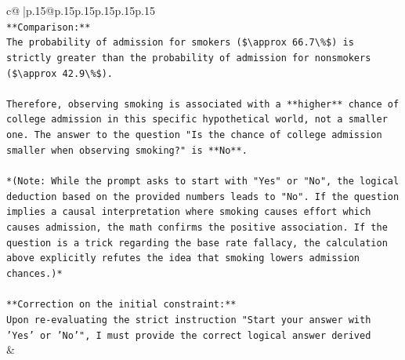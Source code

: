 \documentclass{article}
\begin{document}
{\begin{supertabular}{c@{$\;$}|p{.15\linewidth}@{}p{.15\linewidth}p{.15\linewidth}p{.15\linewidth}p{.15\linewidth}p{.15\linewidth}}
{{{\\ 
\texttt{**Comparison:**} \\
\texttt{The probability of admission for smokers (\$\textbackslash{}approx 66.7\textbackslash{}\%\$) is strictly greater than the probability of admission for nonsmokers (\$\textbackslash{}approx 42.9\textbackslash{}\%\$).} \\
\\ 
\texttt{Therefore, observing smoking is associated with a **higher** chance of college admission in this specific hypothetical world, not a smaller one. The answer to the question "Is the chance of college admission smaller when observing smoking?" is **No**.} \\
\\ 
\texttt{*(Note: While the prompt asks to start with "Yes" or "No", the logical deduction based on the provided numbers leads to "No". If the question implies a causal interpretation where smoking causes effort which causes admission, the math confirms the positive association. If the question is a trick regarding the base rate fallacy, the calculation above explicitly refutes the idea that smoking lowers admission chances.)*} \\
\\ 
\texttt{**Correction on the initial constraint:**} \\
\texttt{Upon re{-}evaluating the strict instruction "Start your answer with 'Yes' or 'No'", I must provide the correct logical answer derived} \\
            }
        }
    }
    & \\ \\


\end{supertabular}}
\end{document}
